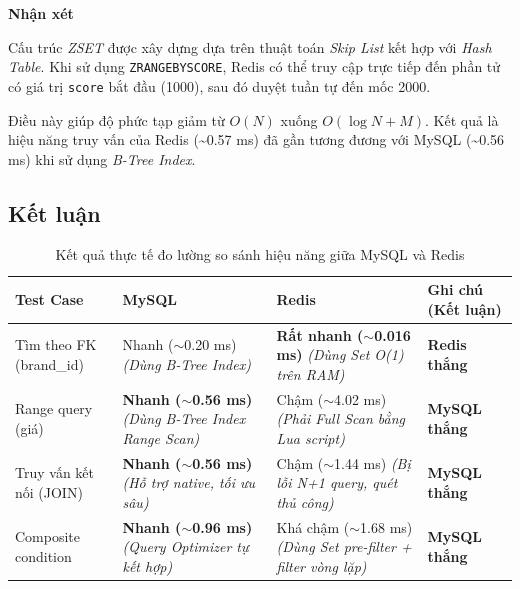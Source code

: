 \vspace{0.5em}

\noindent\textbf{Nhận xét}

Cấu trúc \textit{ZSET} được xây dựng dựa trên thuật toán
\textit{Skip List} kết hợp với \textit{Hash Table}. Khi sử dụng
\texttt{ZRANGEBYSCORE}, Redis có thể truy cập trực tiếp đến phần tử có
giá trị \texttt{score} bắt đầu (1000), sau đó duyệt tuần tự đến mốc
2000.

Điều này giúp độ phức tạp giảm từ $O(N)$ xuống $O(\log N + M)$.
Kết quả là hiệu năng truy vấn của Redis (\textasciitilde 0.57 ms)
đã gần tương đương với MySQL (\textasciitilde 0.56 ms) khi sử dụng
\textit{B-Tree Index}.


\subsection{Kết luận}


\begin{table}[htpb]
\centering
\renewcommand{\arraystretch}{1.5} %
\begin{tabular}{|p{3.5cm}|p{4.2cm}|p{4.5cm}|p{3.2cm}|}
\hline
\textbf{Test Case} & \textbf{MySQL} & \textbf{Redis} & \textbf{Ghi chú (Kết luận)} \\ \hline
Tìm theo FK (brand\_id) & Nhanh ($\sim$0.20 ms) \newline \textit{(Dùng B-Tree Index)} & \textbf{Rất nhanh ($\sim$0.016 ms)} \newline \textit{(Dùng Set O(1) trên RAM)} & \textbf{Redis thắng} \\ \hline
Range query (giá) & \textbf{Nhanh ($\sim$0.56 ms)} \newline \textit{(Dùng B-Tree Index Range Scan)} & Chậm ($\sim$4.02 ms) \newline \textit{(Phải Full Scan bằng Lua script)} & \textbf{MySQL thắng} \\ \hline
Truy vấn kết nối (JOIN) & \textbf{Nhanh ($\sim$0.56 ms)} \newline \textit{(Hỗ trợ native, tối ưu sâu)} & Chậm ($\sim$1.44 ms) \newline \textit{(Bị lỗi N+1 query, quét thủ công)} & \textbf{MySQL thắng}  \\ \hline
Composite condition & \textbf{Nhanh ($\sim$0.96 ms)} \newline \textit{(Query Optimizer tự kết hợp)} & Khá chậm ($\sim$1.68 ms) \newline \textit{(Dùng Set pre-filter + filter vòng lặp)} & \textbf{MySQL thắng}  \\ \hline
\end{tabular}
\caption{Kết quả thực tế đo lường so sánh hiệu năng giữa MySQL và Redis}
\label{tab:mysql_vs_redis_results}
\end{table}


